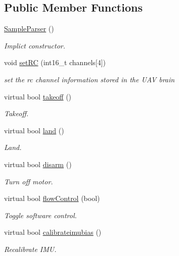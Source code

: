 \subsection*{Public Member Functions}
\begin{DoxyCompactItemize}
\item 
\hyperlink{classSampleParser_a8cea9add13717649b00c4e916fe3b518}{Sample\-Parser} ()
\begin{DoxyCompactList}\small\item\em Implict constructor. \end{DoxyCompactList}\item 
void \hyperlink{classSampleParser_a50ed35fede29930ff853fe6ab175fad6}{set\-R\-C} (int16\-\_\-t channels\mbox{[}4\mbox{]})
\begin{DoxyCompactList}\small\item\em set the rc channel information stored in the U\-A\-V brain \end{DoxyCompactList}\item 
virtual bool \hyperlink{classSampleParser_aaec0124f3a5a19e183438484f98db761}{takeoff} ()
\begin{DoxyCompactList}\small\item\em Takeoff. \end{DoxyCompactList}\item 
virtual bool \hyperlink{classSampleParser_a92ee9e3720b7c420714e2904f81a113a}{land} ()
\begin{DoxyCompactList}\small\item\em Land. \end{DoxyCompactList}\item 
virtual bool \hyperlink{classSampleParser_ad057bfe380db45cda437f53cec2c267a}{disarm} ()
\begin{DoxyCompactList}\small\item\em Turn off motor. \end{DoxyCompactList}\item 
virtual bool \hyperlink{classSampleParser_a265b674d9c0467ed919cff3f4df803b5}{flow\-Control} (bool)
\begin{DoxyCompactList}\small\item\em Toggle software control. \end{DoxyCompactList}\item 
virtual bool \hyperlink{classSampleParser_abb19d034c771cbd02d1961d99ca35f98}{calibrateimubias} ()
\begin{DoxyCompactList}\small\item\em Recalibrate I\-M\-U. \end{DoxyCompactList}\item 

\end{DoxyCompactItemize}
